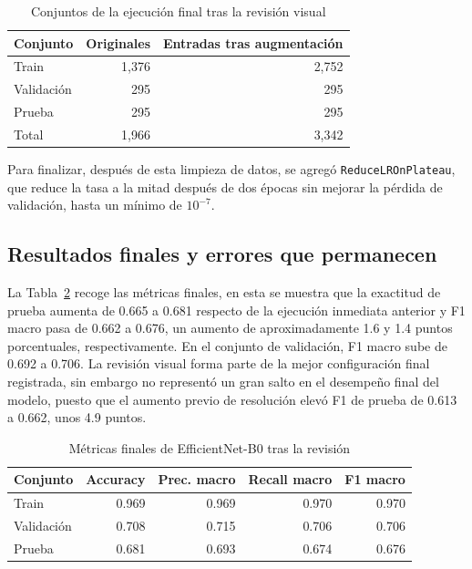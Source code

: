 \documentclass[conference]{IEEEtran}
\begin{document}
\begin{table}[!htbp]
\caption{Conjuntos de la ejecución final tras la revisión visual}
\label{tab:conjuntosfinales}
\centering
\small
\begin{tabular}{lrr}
\toprule
Conjunto & Originales & Entradas tras augmentación \\
\midrule
Train & 1,376 & 2,752 \\
Validación & 295 & 295 \\
Prueba & 295 & 295 \\
\midrule
Total & 1,966 & 3,342 \\
\bottomrule
\end{tabular}
\end{table}

Para finalizar, después de esta limpieza de datos, se agregó  \texttt{ReduceLROnPlateau}, que reduce la tasa a la mitad después de dos épocas sin mejorar la pérdida de validación, hasta un mínimo de $10^{-7}$. 

\subsection{Resultados finales y errores que permanecen}

La Tabla~\ref{tab:metricasefficient} recoge las métricas finales, en esta se muestra que la exactitud de prueba aumenta de 0.665 a 0.681 respecto de la ejecución inmediata anterior y F1 macro pasa de 0.662 a 0.676, un aumento de aproximadamente 1.6 y 1.4 puntos porcentuales, respectivamente. En el conjunto de validación, F1 macro sube de 0.692 a 0.706. La revisión visual forma parte de la mejor configuración final registrada, sin embargo no representó un gran salto en el desempeño final del modelo, puesto que el aumento previo de resolución elevó F1 de prueba de 0.613 a 0.662, unos 4.9 puntos.

\begin{table}[!htbp]
\caption{Métricas finales de EfficientNet-B0 tras la revisión}
\label{tab:metricasefficient}
\centering
\scriptsize
\setlength{\tabcolsep}{3pt}
\begin{tabular}{lrrrr}
\toprule
Conjunto & Accuracy & Prec. macro & Recall macro & F1 macro \\
\midrule
Train & 0.969 & 0.969 & 0.970 & 0.970 \\
Validación & 0.708 & 0.715 & 0.706 & 0.706 \\
Prueba & 0.681 & 0.693 & 0.674 & 0.676 \\
\bottomrule
\end{tabular}
\end{table}
\end{document}
